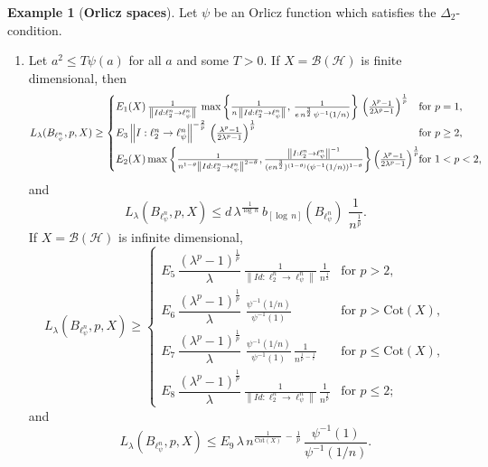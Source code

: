 \documentclass[a4paper,11pt, reqno]{amsart}
\theoremstyle{definition}
\newtheorem{example}{Example}[section]
\newcommand{\norm}[1]{\left\lVert#1\right\rVert}
\begin{document}
\begin{example} [{\bf Orlicz spaces}]
	Let $\psi$ be an Orlicz function which satisfies the $\Delta_{2}$-condition. 
	\begin{enumerate}
		\item Let $a^2 \leq T \psi(a)$ for all $a$ and some $T>0$.  If $X=\mathcal{B}(\mathcal{H})$ is finite dimensional, then
		\begin{equation*}
			L_{\lambda}(B_{\ell^n_{\psi}}, p,X) \geq	\begin{cases}
				E_{1}(X)\, \frac{1}{\norm{Id: \ell^n_{2} \rightarrow \ell^n_{\psi}}} \, \max \left\{\frac{1}{n\, \norm{Id: \ell^n_{2} \rightarrow \ell^n_{\psi}}}, \, \frac{1}{e\,n^{\frac{3}{2}}\, \psi^{-1}(1/n)}\right\}\, \left(\frac{\lambda^p -1}{2\lambda^p - 1}\right)^{\frac{1}{p}} & \text{for $p=1$}, \\[2mm]
				E_{3}\norm{I:\ell^n _2 \rightarrow \ell^n_{\psi}}^{-\frac{2}{p}}\, \left(\frac{\lambda^p -1}{2\lambda^p - 1}\right)^{\frac{1}{p}}\, & \text{for $p \geq 2$}, \\[2mm]
				
				E_{2}(X)  \max \left\{\frac{1}{n^{1-\theta} \norm{Id: \ell^n_{2} \rightarrow \ell^n_{\psi}}^{2-\theta}},  \frac{\norm{I:\ell^n _2 \rightarrow \ell^n_{\psi}}^{-1}}{(en^{\frac{3}{2}})^{(1-\theta)} (\psi^{-1}(1/n))^{1-\theta}}\right\}\left(\frac{\lambda^p -1}{2\lambda^p - 1}\right)^{\frac{1}{p}} \hspace{-4mm}  & \text{for $1<p< 2$}, 
			\end{cases}
		\end{equation*}
		and $$L_{\lambda}(B_{\ell^n_{\psi}}, p,X) \leq d\,  \lambda^{\frac{1}{\log \,n}}\,b_{[\log\,n]}(B_{\ell^n_{\psi}})\, \,\frac{1}{n^{\frac{1}{p}}}.
		$$
		If $X=\mathcal{B}(\mathcal{H})$ is infinite dimensional, 
		$$  L_{\lambda}(B_{\ell^n_{\psi}}, p,X) \geq \begin{cases}
			E_{5}\, \dfrac{\left(\lambda^p -1\right)^{\frac{1}{p}}}{\lambda}\, \frac{1}{\norm{Id: \ell^n_{2} \rightarrow \ell^n_{\psi}}}\,  \frac{1}{  n^{\frac{1}{2}}} & \text{for $p > 2$}, \\[2mm]
			
			E_{6}\,\dfrac{\left(\lambda^p -1\right)^{\frac{1}{p}}}{\lambda}\, \,  \frac{\psi^{-1}(1/n)}{ \psi^{-1}(1)} & \text{for $p>\mathrm{Cot}(X)$}, \\[2mm]
			E_{7}\, \dfrac{\left(\lambda^p -1\right)^{\frac{1}{p}}}{\lambda}\,  \, \frac{\psi^{-1}(1/n)}{ \psi^{-1}(1)}\, \frac{ 1}{n^{\frac{1}{p}-\frac{1}{t}}} & \text{for $p\leq  \mathrm{Cot}(X)$},\\[2mm]
			E_{8}\, \dfrac{\left(\lambda^p -1\right)^{\frac{1}{p}}}{\lambda}\,   \frac{1}{\norm{Id: \ell^n_{2} \rightarrow \ell^n_{\psi}}}\, \frac{1}{  n^{\frac{1}{p}}} & \text{for $p \leq 2$};
		\end{cases}$$
		and
		\begin{equation*}
			L_{\lambda}(B_{\ell^n_{\psi}}, p,X) \leq 	
			E_9\,\lambda\, n^{\frac{1}{\mathrm{Cot}(X)}\, - \,\frac{1}{p}} \, \frac{\psi^{-1}(1)}{ \psi^{-1}(1/n)}. 
		\end{equation*}
		

\end{enumerate}
\end{example}
\end{document}
